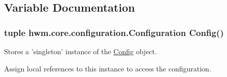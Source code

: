 \subsection{Variable Documentation}
\hypertarget{namespacehwm_1_1core_1_1configuration_a87c77155d12f2ea9ccfb44c9602cb86a}{
\subsubsection[{Configuration}]{\setlength{\rightskip}{0pt plus 5cm}tuple hwm.\-core.\-configuration.\-Configuration {\bf Config}()}}\label{namespacehwm_1_1core_1_1configuration_a87c77155d12f2ea9ccfb44c9602cb86a}


Stores a 'singleton' instance of the \hyperlink{classhwm_1_1core_1_1configuration_1_1_config}{Config} object. 

Assign local references to this instance to access the configuration. 
